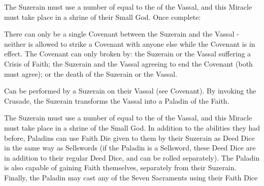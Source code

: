 {The Suzerain must use a number of \DICE equal to the \LVL of the Vassal, and this Miracle must take place in a shrine of their Small God.  Once complete:


There can only be a single Covenant between the Suzerain and the Vassal - neither is allowed to strike a Covenant with anyone else while the Covenant is in effect.  The Covenant can only broken by: the Suzerain or the Vassal suffering a Crisis of Faith; the Suzerain and the Vassal agreeing to end the Covenant (both must agree); or the death of the Suzerain or the Vassal.




Can be performed by a Suzerain on their Vassal (see Covenant).  By invoking the Crusade, the Suzerain transforms the Vassal into a Paladin of the Faith.  

The Suzerain must use a number of \DICE equal to the \LVL of the Vassal, and this Miracle must take place in a shrine of the Small God.  In addition to the abilities they had before, Paladins can use Faith Die given to them by their Suzerain as Deed Dice in the same way as Sellswords (if the Paladin is a Sellsword, these Deed Dice are in addition to their regular Deed Dice, and can be rolled separately).  The Paladin is also capable of gaining Faith themselves, separately from their Suzerain.  Finally, the Paladin may cast any of the Seven Sacraments using their Faith Dice

}
